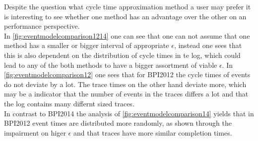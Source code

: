 \documentclass[
	a4paper,
	pagesize,
	pdftex,
	12pt,
	twoside, %
	BCOR=5mm, %
	ngerman,
	fleqn,
	final,
	]{scrartcl}
\begin{document}
Despite the question what cycle time approximation method a user may prefer it is interesting to see whether one method has an advantage over the other on an performance perspective.\\
In \ref{fig:eventmodelcomparison1214} one can see that one can not assume that one method has a smaller or bigger interval of appropriate $\epsilon$, instead one sees that this is also dependent on the distribution of cycle times in te log, which could lead to any of the both methods to have a bigger assortment of viable $\epsilon$.
In \ref{fig:eventmodelcomparison12} one sees that for BPI2012 the cycle times of events do not deviate by a lot. The trace times on the other hand deviate more, which may be a indicator that the number of events in the traces differs a lot and that the log contains many differnt sized traces.\\
In contrast to BPI2014 the analysis of \ref{fig:eventmodelcomparison14} yields that in BPI2012 event times are distributed more randomly, as shown through the impairment on higer $\epsilon$ and that traces have more similar completion times.\\
\end{document}

